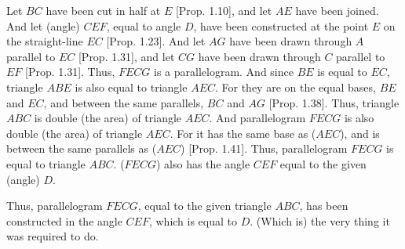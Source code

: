 \begin{Parallel}{}{}
{Let $BC$ have been cut in half at $E$ [Prop. 1.10], and let $AE$ have been joined. And let (angle) $CEF$, equal to angle $D$,  have been constructed
at the point $E$ on the straight-line $EC$ [Prop. 1.23]. And let $AG$ have been drawn through $A$
parallel to $EC$ [Prop. 1.31], and let $CG$ have been drawn through $C$ parallel
to $EF$ [Prop. 1.31]. Thus, $FECG$ is a parallelogram. And since $BE$ is
equal to $EC$, triangle $ABE$ is also equal to triangle $AEC$. For they are
on the equal bases, $BE$ and $EC$, and between the same parallels, $BC$ and $AG$ [Prop. 1.38]. Thus, triangle $ABC$ is double (the area) of triangle $AEC$. And
parallelogram $FECG$ is also double (the area) of triangle $AEC$. For it has the same base as ($AEC$), and is between the same parallels  as ($AEC$) [Prop. 1.41].
Thus, parallelogram $FECG$ is equal to triangle $ABC$.  ($FECG$) also has
the angle $CEF$ equal to the given (angle) $D$.

Thus, parallelogram $FECG$,  equal to the given
triangle $ABC$, has been constructed in the angle $CEF$, which is equal to $D$. (Which is) the
very thing it was required to do.}
\end{Parallel}

